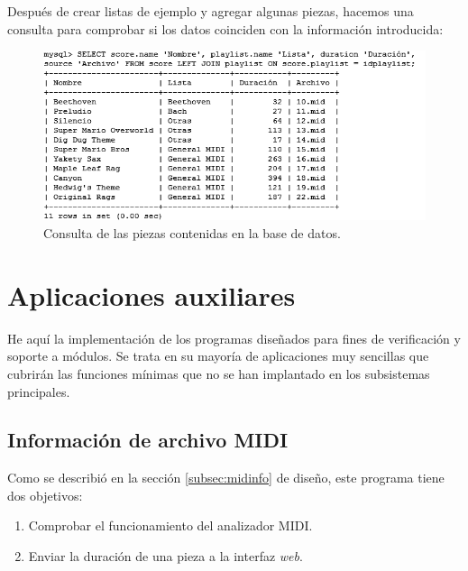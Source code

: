 \smallskip

Después de crear listas de ejemplo y agregar algunas piezas, hacemos una consulta para comprobar si los datos coinciden con la información introducida:

\smallskip

\begin{figure}[H]
	\noindent \begin{centering}
		\includegraphics[width=\linewidth]{capitulo5/cap_sql}
		\par\end{centering}
	\smallskip
	\caption{\label{fig:cap_sql} Consulta de las piezas contenidas en la base de datos.}
\end{figure} 

\smallskip

\newpage

\section{Aplicaciones auxiliares}

He aquí la implementación de los programas diseñados para fines de verificación y soporte a módulos. Se trata en su mayoría de aplicaciones muy sencillas que cubrirán las funciones mínimas que no se han implantado en los subsistemas principales.

\subsection{Información de archivo MIDI}

Como se describió en la sección \ref{subsec:midinfo} de diseño, este programa tiene dos objetivos:

\begin{enumerate}
	\item Comprobar el funcionamiento del analizador \acrshort{MIDI}.
	\item Enviar la duración de una pieza a la interfaz \textit{web}.
\end{enumerate}

